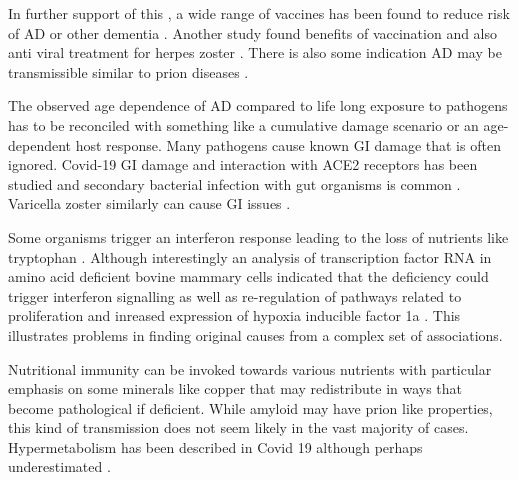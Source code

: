{In further support of this , a wide range of vaccines has been found to
reduce risk of AD or other dementia \cite{10.1093/ageing/afaf331}.
Another study found benefits of vaccination and also anti viral 
treatment for herpes zoster \cite{Marra_Gomes_Liu_Effects_herpes_zoster_2025}. 
There is also some indication AD may be transmissible
similar to prion diseases \cite{Saw_Yi_Tan_Evidence_Suggesting_That_Alzheimer_2025}
\cite{PMID41855455}
.


The observed age dependence of AD compared to life long
exposure to pathogens has to be reconciled with something
like a cumulative damage scenario or an age-dependent
host response. 
Many pathogens cause known GI damage that is often ignored.
Covid-19 GI damage and interaction with ACE2 receptors has been studied
\cite{Masir_Shirvaliloo_Symptomatology_microbiology_2022}
and secondary bacterial infection with gut organisms is common
\cite{BernardRaichon_Venzon_Klein_microbiome_dysbiosis_2022}.
Varicella zoster similarly can cause GI issues
\cite{Mostyka_Shia_Neumann_Clinicopathologic_Features_Varicella_2021}.



Some organisms  trigger an interferon response leading to the loss of 
nutrients like tryptophan
\cite{Zhang2024_trp}.
Although interestingly an analysis of transcription factor
 RNA in amino acid deficient
bovine mammary cells indicated that the deficiency could trigger 
interferon signalling
as well as re-regulation of pathways related to proliferation
and inreased expression of hypoxia inducible factor 1a
\cite{Li_Innes_Ribeiro_sequencing_analysis_2026}. 
This illustrates problems in finding original causes
from a complex set of associations. 

Nutritional immunity can be invoked  
\cite{Murdoch_Skaar_Nutritional_immunity_battle_2022}
towards various nutrients 
with particular emphasis on some minerals like copper
\cite{Cheng_Peng_Lu_Relationship_between_copper_2022}
that may redistribute in ways that become pathological if deficient. 
While amyloid may have prion like properties, this kind of
transmission does not seem likely in the vast majority
of cases.
Hypermetabolism has been described in Covid 19 although perhaps
underestimated
\cite{Burslem_Gottesman_Newkirk_Energy_requirements_critically_2022}
. 
}%

